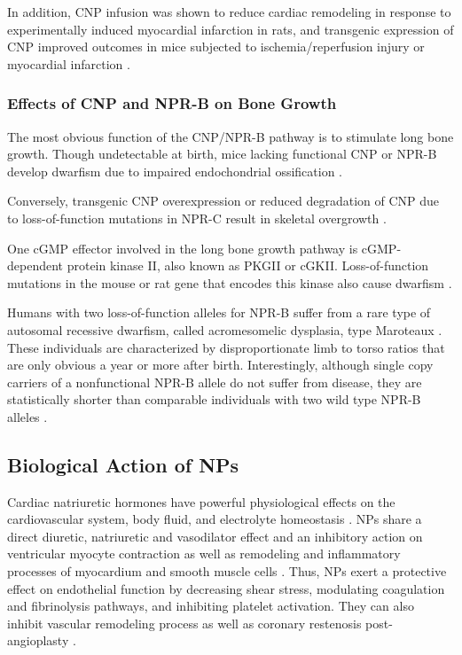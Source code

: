 \documentclass[14pt,a4paper,onecolumn]{extarticle}
\begin{document}
In addition, CNP infusion was shown to reduce cardiac remodeling in response to experimentally induced myocardial infarction in rats, and transgenic expression of CNP improved outcomes in mice subjected to ischemia/reperfusion injury or myocardial infarction \citep{Wang2007}.



\subsubsection{Effects of CNP and NPR-B on Bone Growth}

The most obvious function of the CNP/NPR-B pathway is to stimulate long bone growth. Though undetectable at birth, mice lacking functional CNP or NPR-B develop dwarfism due to impaired endochondrial ossification \citep{Tsuji2005}.

Conversely, transgenic CNP overexpression or reduced degradation of CNP due to loss-of-function mutations in NPR-C result in skeletal overgrowth \citep{Yasoda2004}.



One cGMP effector involved in the long bone growth pathway is cGMP-dependent protein kinase II, also known as PKGII or cGKII. Loss-of-function mutations in the mouse or rat gene that encodes this kinase also cause dwarfism \citep{Chikuda2004}.



Humans with two loss-of-function alleles for NPR-B suffer from a rare type of autosomal recessive dwarfism, called acromesomelic dysplasia, type Maroteaux \citep{Bartels2004}. These individuals are characterized by disproportionate limb to torso ratios that are only obvious a year or more after birth. Interestingly, although single copy carriers of a nonfunctional NPR-B allele do not suffer from disease, they are statistically shorter than comparable individuals with two wild type NPR-B alleles \citep{Olney2006}.



\subsection{Biological Action of NPs }



Cardiac natriuretic hormones have powerful physiological effects on the cardiovascular system, body fluid, and electrolyte homeostasis \citep{13} \citep{28}. NPs share a direct diuretic, natriuretic and vasodilator effect and an inhibitory action on ventricular myocyte contraction \citep{79} as well as remodeling and inflammatory processes of myocardium and smooth muscle cells \citep{82} \citep{83}. Thus, NPs exert a protective effect on endothelial function by decreasing shear stress, modulating coagulation and fibrinolysis pathways, and inhibiting platelet activation. They can also inhibit vascular remodeling process as well as coronary restenosis post-angioplasty \citep{56} \citep{87} \citep{88} \citep{89}.
\end{document}
